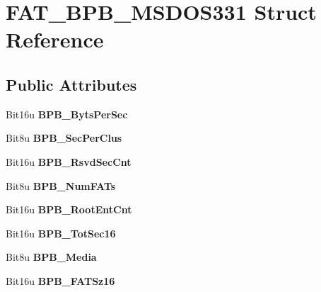 \hypertarget{structFAT__BPB__MSDOS331}{\section{F\-A\-T\-\_\-\-B\-P\-B\-\_\-\-M\-S\-D\-O\-S331 Struct Reference}
\label{structFAT__BPB__MSDOS331}
}
\subsection*{Public Attributes}
\begin{DoxyCompactItemize}
\item 
\hypertarget{structFAT__BPB__MSDOS331_abc66cd28ea2a6421cc46fd7383360654}{Bit16u {\bfseries B\-P\-B\-\_\-\-Byts\-Per\-Sec}}\label{structFAT__BPB__MSDOS331_abc66cd28ea2a6421cc46fd7383360654}

\item 
\hypertarget{structFAT__BPB__MSDOS331_a603f16b08cf52ff8c5f4d3061f4d07ef}{Bit8u {\bfseries B\-P\-B\-\_\-\-Sec\-Per\-Clus}}\label{structFAT__BPB__MSDOS331_a603f16b08cf52ff8c5f4d3061f4d07ef}

\item 
\hypertarget{structFAT__BPB__MSDOS331_a54a1ceab7d97ef34fe518053562c7af3}{Bit16u {\bfseries B\-P\-B\-\_\-\-Rsvd\-Sec\-Cnt}}\label{structFAT__BPB__MSDOS331_a54a1ceab7d97ef34fe518053562c7af3}

\item 
\hypertarget{structFAT__BPB__MSDOS331_aa54c5307df69205d6344ee2f6f029d35}{Bit8u {\bfseries B\-P\-B\-\_\-\-Num\-F\-A\-Ts}}\label{structFAT__BPB__MSDOS331_aa54c5307df69205d6344ee2f6f029d35}

\item 
\hypertarget{structFAT__BPB__MSDOS331_ad668e340982999b6d9778009954539fe}{Bit16u {\bfseries B\-P\-B\-\_\-\-Root\-Ent\-Cnt}}\label{structFAT__BPB__MSDOS331_ad668e340982999b6d9778009954539fe}

\item 
\hypertarget{structFAT__BPB__MSDOS331_a3b9ea9c765a552b54bb98a98dbf98b31}{Bit16u {\bfseries B\-P\-B\-\_\-\-Tot\-Sec16}}\label{structFAT__BPB__MSDOS331_a3b9ea9c765a552b54bb98a98dbf98b31}

\item 
\hypertarget{structFAT__BPB__MSDOS331_a76d8a4d06815472789234733de63710d}{Bit8u {\bfseries B\-P\-B\-\_\-\-Media}}\label{structFAT__BPB__MSDOS331_a76d8a4d06815472789234733de63710d}

\item 
\hypertarget{structFAT__BPB__MSDOS331_ae659b52d93946e103cd0d77a11d8d8b9}{Bit16u {\bfseries B\-P\-B\-\_\-\-F\-A\-T\-Sz16}}\label{structFAT__BPB__MSDOS331_ae659b52d93946e103cd0d77a11d8d8b9}


\end{DoxyCompactItemize}
